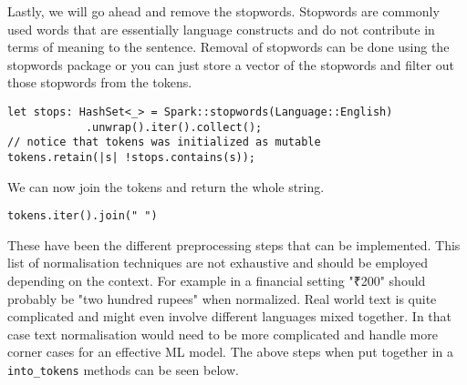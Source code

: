 \documentclass{book}
\begin{document}
Lastly, we will go ahead and remove the stopwords. Stopwords are commonly used words that are essentially language constructs and do not contribute in terms of meaning to the sentence. Removal of stopwords can be done using the stopwords package or you can just store a vector of the stopwords and filter out those stopwords from the tokens.

\begin{lstlisting}[caption={chapter5\\/fasttext\\-model\\/src\\/main\\.rs}, basicstyle=\small]
let stops: HashSet<_> = Spark::stopwords(Language::English)
            .unwrap().iter().collect();
// notice that tokens was initialized as mutable
tokens.retain(|s| !stops.contains(s));
\end{lstlisting}

We can now join the tokens and return the whole string.

\begin{lstlisting}[caption={chapter5\\/fasttext\\-model\\/src\\/main\\.rs}, basicstyle=\small]
tokens.iter().join(" ")
\end{lstlisting}

These have been the different preprocessing steps that can be implemented. This list of normalisation techniques are not exhaustive and should be employed depending on the context. For example in a financial setting "₹200" should probably be "two hundred rupees" when normalized. Real world text is quite complicated and might even involve different languages mixed together. In that case text normalisation would need to be more complicated and handle more corner cases for an effective ML model. The above steps when put together in a \lstinline{into_tokens} methods can be seen below.
\end{document}
